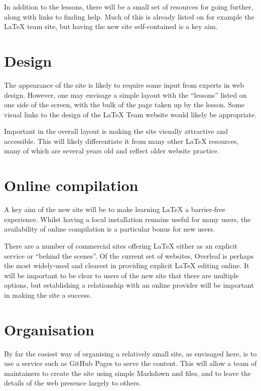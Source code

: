 \documentclass{article}
\begin{document}
In addition to the lessons, there will be a small set of resources for going
further, along with links to finding help. Much of this is already listed on
for example the \LaTeX{} team site, but having the new site self-contained is a
key aim.

\section{Design}

The appearance of the site is likely to require some input from experts in web
design. However, one may envisage a simple layout with the \enquote{lessons}
listed on one side of the screen, with the bulk of the page taken up by the
lesson. Some visual links to the design of the \LaTeX{} Team website would
likely be appropriate.

Important in the overall layout is making the site visually attractive and
accessible. This will likely differentiate it from many other \LaTeX{}
resources, many of which are several years old and reflect older website
practice.

\section{Online compilation}

A key aim of the new site will be to make learning \LaTeX{} a barrier-free
experience. Whilst having a local installation remains useful for many users,
the availability of online compilation is a particular bonus for new users.

There are a number of commercial sites offering \LaTeX{} either as an explicit
service or \enquote{behind the scenes}. Of the current set of websites,
Overleaf is perhaps the most widely-used and clearest in providing explicit
\LaTeX{} editing online. It will be important to be clear to users of the new
site that there are multiple options, but establishing a relationship with an
online provider will be important in making the site a success.

\section{Organisation}

By far the easiest way of organising a relatively small site, as envisaged
here, is to use a service such as GitHub Pages to serve the content. This will
allow a team of maintainers to create the site using simple Markdown and
 files, and to leave the details of the web presence largely to
others.
\end{document}
